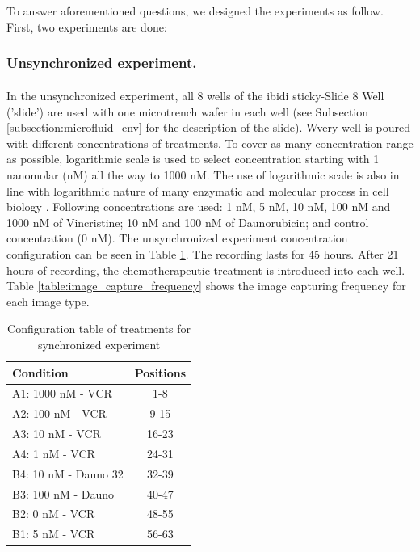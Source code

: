 \documentclass[pdftex,12pt,a4paper]{report}
\begin{document}
To answer aforementioned questions, we designed the experiments as follow. First, two experiments are done:

\subsubsection*{Unsynchronized experiment.}

In the unsynchronized experiment, all 8 wells of the ibidi\textsuperscript{\textregistered} sticky-Slide 8 Well ('slide') are used with one microtrench wafer in each well (see Subsection \ref{subsection:microfluid_env} for the description of the slide). Wvery well is poured with different concentrations of treatments. To cover as many concentration range as possible, logarithmic scale is used to select concentration starting with 1 nanomolar (nM) all the way to 1000 nM. The use of logarithmic scale is also in line with logarithmic nature of many enzymatic and molecular process in cell biology \cite{wilkinson1961statistical, savageau1969biochemical}. Following concentrations are used:  1 nM, 5 nM, 10 nM, 100 nM and 1000 nM of Vincristine; 10 nM and 100 nM of Daunorubicin; and control concentration (0 nM). The unsynchronized experiment concentration configuration can be seen in Table \ref{table:unsyn_treatments}. The recording lasts for 45 hours. After 21 hours of recording, the chemotherapeutic treatment is introduced into each well. Table \ref{table:image_capture_frequency} shows the image capturing frequency for each image type.

\begin{table}[H]
\centering
\begin{tabular}{| l | c |}
\hline
Condition & Positions \\
\hline
A1: 1000 nM - VCR & 1-8 \\
A2: 100 nM - VCR & 9-15 \\
A3: 10 nM - VCR & 16-23 \\
A4: 1 nM - VCR & 24-31 \\
B4: 10 nM - Dauno 32 & 32-39 \\
B3: 100 nM - Dauno & 40-47 \\
B2: 0 nM - VCR & 48-55 \\
B1: 5 nM - VCR & 56-63 \\
\hline
\end{tabular}
\caption{Configuration table of treatments for synchronized experiment}
\label{table:unsyn_treatments}
\end{table}
\end{document}
